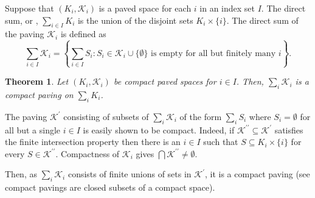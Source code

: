\documentclass[12pt]{article}
\newtheorem*{theorem*}{Theorem}
\begin{document}

Suppose that $(K_i,\mathcal{K}_i)$ is a paved space for each $i$ in an index set $I$. The direct sum, or , $\sum_{i\in I}K_i$ is the union of the disjoint sets $K_i\times\{i\}$. The direct sum of the paving $\mathcal{K}_i$ is defined as
\begin{equation*}
\sum_{i\in I}\mathcal{K}_i=\left\{\sum_{i\in I}S_i\colon S_i\in\mathcal{K}_i\cup\{\emptyset\}\text{ is empty for all but finitely many }i\right\}.
\end{equation*}

\begin{theorem*}
Let $(K_i,\mathcal{K}_i)$ be compact paved spaces for $i\in I$. Then, $\sum_i\mathcal{K}_i$ is a compact paving on $\sum_iK_i$.
\end{theorem*}

The paving $\mathcal{K}^\prime$ consisting of subsets of $\sum_i\mathcal{K}_i$ of the form $\sum_iS_i$ where $S_i=\emptyset$ for all but a single $i\in I$ is easily shown to be compact.
Indeed, if $\mathcal{K}^{\prime\prime}\subseteq \mathcal{K}^\prime$ satisfies the finite intersection property then there is an $i\in I$ such that $S\subseteq K_i\times\{i\}$ for every $S\in\mathcal{K}^{\prime\prime}$. Compactness of $\mathcal{K}_i$ gives $\bigcap\mathcal{K}^{\prime\prime}\not=\emptyset$.

Then, as $\sum_i\mathcal{K}_i$ consists of finite unions of sets in $\mathcal{K}^\prime$, it is a compact paving (see compact pavings are closed subsets of a compact space).

\end{document}
